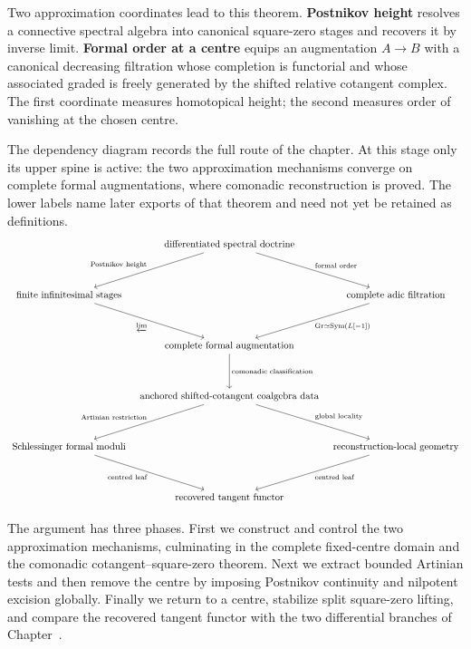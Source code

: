 Two approximation coordinates lead to this theorem. \textbf{Postnikov height} resolves a
connective spectral algebra into canonical square-zero stages and recovers it by inverse
limit. \textbf{Formal order at a centre} equips an augmentation \(A\to B\) with a
canonical decreasing filtration whose completion is functorial and whose associated
graded is freely generated by the shifted relative cotangent complex. The first
coordinate measures homotopical height; the second measures order of vanishing at the
chosen centre.

The dependency diagram records the full route of the chapter. At this stage only its
upper spine is active: the two approximation mechanisms converge on complete formal
augmentations, where comonadic reconstruction is proved. The lower labels name later
exports of that theorem and need not yet be retained as definitions.
\[
\begin{tikzcd}[column sep=tiny,row sep=huge]
    & \text{differentiated spectral doctrine}
        \arrow[dl,"\text{Postnikov height}"']
        \arrow[dr,"\text{formal order}"]
    &
    \\
    \text{finite infinitesimal stages}
        \arrow[dr,"\varprojlim"']
    &&
    \text{complete adic filtration}
        \arrow[dl,"{\operatorname{Gr}\simeq\operatorname{Sym}(L[-1])}"]
    \\
    & \text{complete formal augmentation}
        \arrow[d,"\text{comonadic classification}"]
    &
    \\
    & \text{anchored shifted-cotangent coalgebra data}
        \arrow[dl,"\text{Artinian restriction}"']
        \arrow[dr,"\text{global locality}"]
    &
    \\
    \text{Schlessinger formal moduli}
        \arrow[dr,"\text{centred leaf}"']
    &&
    \text{reconstruction-local geometry}
        \arrow[dl,"\text{centred leaf}"]
    \\
    & \text{recovered tangent functor}
    &
\end{tikzcd}
\]

The argument has three phases. First we construct and control the two approximation
mechanisms, culminating in the complete fixed-centre domain and the comonadic
cotangent--square-zero theorem. Next we extract bounded Artinian tests and then remove
the centre by imposing Postnikov continuity and nilpotent excision globally. Finally we
return to a centre, stabilize split square-zero lifting, and compare the recovered
tangent functor with the two differential branches of
Chapter~.

